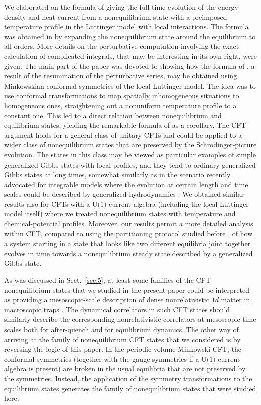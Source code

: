\documentclass[12pt,a4paper]{article}
\theoremstyle{definition}
\theoremstyle{remark}
\begin{document}
We elaborated on the formula of \cite{LLMM2} giving the full time evolution of the energy density and heat current from a nonequilibrium state with a preimposed temperature profile in the Luttinger model with local interactions. 
The formula was obtained in \cite{LLMM2} by expanding the nonequilibrium state around the equilibrium to all orders.
More details on the perturbative computation involving the exact calculation of complicated integrals, that may be interesting in its own right, were given.
The main part of the paper was devoted to showing how the formula of \cite{LLMM2}, a result of the resummation of the perturbative series, may be obtained using Minkowskian conformal symmetries of the local Luttinger model.
The idea was to use conformal transformations to map spatially inhomogeneous situations to homogeneous ones, straightening out a nonuniform temperature profile to a constant one.
This led to a direct relation between nonequilibrium and equilibrium states, 
yielding the remarkable formula of \cite{LLMM2} as a corollary.
The CFT argument holds for a general class of unitary CFTs and could be applied to
a wider class of nonequilibrium states that are preserved by the Schr\"odinger-picture evolution. The states in this class may be viewed as particular examples of 
simple generalized Gibbs states with local profiles, and they tend to ordinary
generalized Gibbs states at long times, 
somewhat similarly as in the scenario recently advocated for integrable 
models where the evolution at certain length and time scales could be 
described by generalized hydrodynamics
\cite{BCNF,CBT,BVKM2,DSpY,DSp,DoYo,IlDeN,CDDKY,Do}.
We obtained similar results also for CFTs with a $\text{U(1)}$ current 
algebra (including the local Luttinger model itself) where we treated 
nonequilibrium states with temperature and chemical-potential profiles.
Moreover, our results permit a more detailed analysis within CFT, compared 
to using the partitioning protocol studied before \cite{BeDo3}, of how 
a system starting in a state that looks like two different equilibria 
joint together evolves in time towards a nonequilibrium steady state 
described by a generalized Gibbs state. 

As was discussed in Sect.~\ref{sec:5}, at least some families
of the CFT nonequilibrium states that we studied in the present paper could 
be interpreted as providing a mesoscopic-scale description of dense
nonrelativistic $1d$ matter in macroscopic traps \cite{DSVC,BD1,DSC,BD2}.
The dynamical correlators in such CFT states should similarly describe
the corresponding nonrelativistic correlators at mesoscopic time scales
both for after-quench and for equilibrium dynamics. The other way of arriving
at the family of nonequilibrium CFT states that we considered is by reversing
the logic of this paper. In the periodic-volume Minkowski CFT, the conformal
symmetries (together with the gauge symmetries if a $\text{U(1)}$ current
algebra is present) are broken in the usual equilibria that are not preserved
by the symmetries. Instead, the application of the symmetry
transformations to the equilibrium states generates the family of
nonequilibrium states that were studied here.
\end{document}
